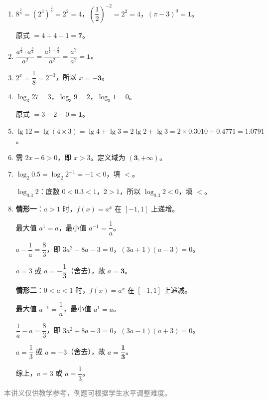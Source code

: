 \documentclass[12pt, a4paper]{ctexart}
\begin{document}
\vspace{20pt}
\begin{knowledgebox}[参考答案]
\begin{enumerate}[leftmargin=2em, label=\textbf{\arabic*.}]

  \item $8^{\frac{2}{3}} = (2^3)^{\frac{2}{3}} = 2^2 = 4$，$\left(\dfrac{1}{2}\right)^{-2} = 2^2 = 4$，$(\pi-3)^0 = 1$。\par
  原式 $= 4 + 4 - 1 = \mathbf{7}$。

  \item $\dfrac{a^{\frac{1}{2}} \cdot a^{\frac{3}{2}}}{a^2} = \dfrac{a^{\frac{1}{2}+\frac{3}{2}}}{a^2} = \dfrac{a^2}{a^2} = \mathbf{1}$。

  \item $2^x = \dfrac{1}{8} = 2^{-3}$，所以 $x = \mathbf{-3}$。

  \item $\log_3 27 = 3$，$\log_3 9 = 2$，$\log_3 1 = 0$。\par
  原式 $= 3 - 2 + 0 = \mathbf{1}$。

  \item $\lg 12 = \lg(4\times 3) = \lg 4 + \lg 3 = 2\lg 2 + \lg 3 = 2\times 0.3010 + 0.4771 = \mathbf{1.0791}$。

  \item 需 $2x-6>0$，即 $x>3$。定义域为 $\mathbf{(3, +\infty)}$。

  \item $\log_2 0.5 = \log_2 2^{-1} = -1 < 0$，填 $\mathbf{<}$。\par
  $\log_{0.3} 2$：底数 $0<0.3<1$，$2>1$，所以 $\log_{0.3} 2 < 0$，填 $\mathbf{<}$。

  \item \textbf{情形一}：$a>1$ 时，$f(x)=a^x$ 在 $[-1,1]$ 上递增。\par
  最大值 $a^1 = a$，最小值 $a^{-1} = \dfrac{1}{a}$。\par
  $a - \dfrac{1}{a} = \dfrac{8}{3}$，即 $3a^2 - 8a - 3 = 0$，$(3a+1)(a-3)=0$。\par
  $a=3$ 或 $a=-\dfrac{1}{3}$（舍去），故 $a=\mathbf{3}$。\par
  \textbf{情形二}：$0<a<1$ 时，$f(x)=a^x$ 在 $[-1,1]$ 上递减。\par
  最大值 $a^{-1}=\dfrac{1}{a}$，最小值 $a^1=a$。\par
  $\dfrac{1}{a}-a=\dfrac{8}{3}$，即 $3a^2+8a-3=0$，$(3a-1)(a+3)=0$。\par
  $a=\dfrac{1}{3}$ 或 $a=-3$（舍去），故 $a=\mathbf{\dfrac{1}{3}}$。\par
  综上，$a = 3$ 或 $a = \dfrac{1}{3}$。

\end{enumerate}
\end{knowledgebox}

\vfill
\begin{center}
\small\textcolor{gray}{本讲义仅供教学参考，例题可根据学生水平调整难度。}
\end{center}
\end{document}
